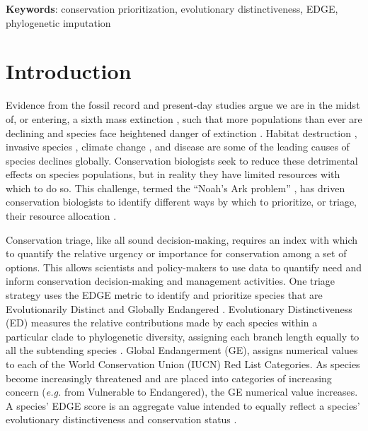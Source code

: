 \documentclass[10pt,english]{article}
\begin{document}
\textbf{Keywords}: conservation prioritization, evolutionary distinctiveness, 
EDGE, phylogenetic imputation

\clearpage
\section*{Introduction}

Evidence from the fossil record and present-day studies argue we are in the
midst of, or entering, a sixth mass extinction \autocite{Barnosky2011,
Ceballos2015}, such that more populations than ever are declining and species
face heightened danger of extinction \autocite{Wake2008, Thomas2004}. Habitat
destruction \autocite{Brooks2002}, invasive species \autocite{Molnar2008},
climate change \autocite{Pounds2006}, and disease \autocite{Lips2006} are some
of the leading causes of species declines globally. Conservation biologists seek
to reduce these detrimental effects on species populations, but in reality they
have limited resources with which to do so. This challenge, termed the “Noah's
Ark problem” \autocite{Weitzman1998}, has driven conservation biologists to
identify different ways by which to prioritize, or triage, their resource
allocation \autocite{Bottrill2008}.

Conservation triage, like all sound decision-making, requires an index with
which to quantify the relative urgency or importance for conservation among a
set of options. This allows scientists and policy-makers to use data to quantify
need and inform conservation decision-making and management activities. One
triage strategy uses the EDGE metric to identify and prioritize species that are
Evolutionarily Distinct and Globally Endangered \autocite{Isaac2007}.
Evolutionary Distinctiveness (ED) measures the relative contributions made by
each species within a particular clade to phylogenetic diversity, assigning each
branch length equally to all the subtending species \autocite{Redding2003,
Isaac2007}. Global Endangerment (GE), assigns numerical values to each of the
World Conservation Union (IUCN) Red List Categories. As species become
increasingly threatened and are placed into categories of increasing concern
(\emph{e.g.} from Vulnerable to Endangered), the GE numerical value increases. A
species’ EDGE score is an aggregate value intended to equally reflect a
species’ evolutionary distinctiveness and conservation status \autocite[even if
it does not always in practice; see][]{Pearse2015}.
\end{document}
